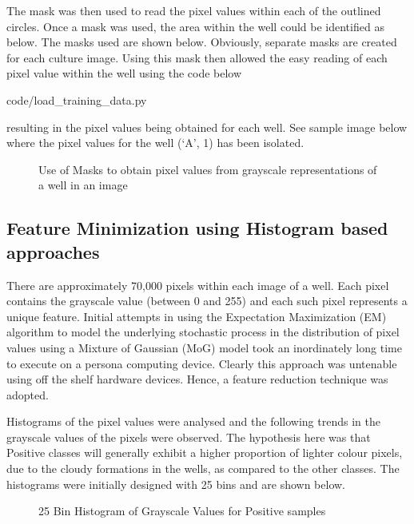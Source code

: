 \documentclass[a4paper,twoside,12pt]{report}
\begin{document}
The mask was then used to read the pixel values within each of the outlined circles.   Once a mask was used, the area within the well could be identified as below.   The masks used are shown below.   Obviously, separate masks are created for each culture image. Using this mask then allowed the easy reading of each pixel value within the well using the code below 


{code/load_training_data.py}

resulting in the pixel values being obtained for each well.  See sample image below where the pixel values for the well (‘A’, 1) has been isolated. 

\begin{figure}[!htbp]
\centering
{}\hfill
{}
\caption{Use of Masks to obtain pixel values from grayscale representations of a well in an image}
\label{fig:subfigures}
\end{figure}

\subsection{Feature Minimization using Histogram based approaches} 

There are approximately 70,000 pixels within each image of a well.   Each pixel contains the grayscale value (between 0 and 255) and each such pixel represents a unique feature. 
Initial attempts in using the Expectation Maximization (EM) algorithm to model the underlying stochastic process in the distribution of pixel values using a Mixture of Gaussian (MoG) model took an inordinately long time to execute on a persona computing device.    Clearly this approach was untenable using off the shelf hardware devices.   Hence, a feature reduction technique was adopted. 

Histograms of the pixel values were analysed and the following trends in the grayscale values of the pixels were observed.    The hypothesis here was that Positive classes will generally exhibit a higher proportion of lighter colour pixels, due to the cloudy formations in the wells, as compared to the other classes.   The histograms were initially designed with 25 bins and are shown below. 

\begin{figure}[!htbp]
\centering
{}\hfill
{}
\caption{25 Bin Histogram of Grayscale Values for Positive samples}
\label{fig:subfigures}
\end{figure}
\end{document}
